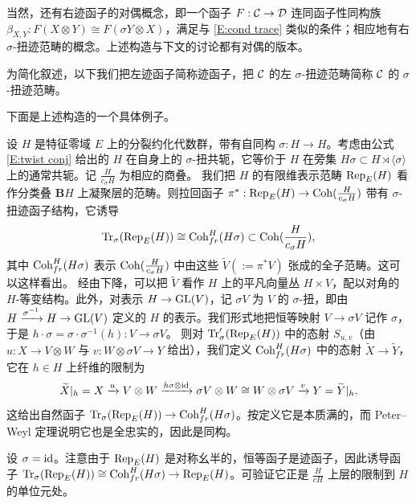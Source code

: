 \begin{rmk}
当然，还有右迹函子的对偶概念，即一个函子 $F:{\mathcal C}\to {\mathcal D}$ 连同函子性同构族 $\beta_{X,Y}: F(X\otimes Y)\cong F(\sigma Y\otimes X)$，满足与 \eqref{E:cond trace} 类似的条件；相应地有右 $\sigma$-扭迹范畴的概念。上述构造与下文的讨论都有对偶的版本。

为简化叙述，以下我们把左迹函子简称迹函子，把 ${\mathcal C}$ 的左 $\sigma$-扭迹范畴简称 ${\mathcal C}$ 的 $\sigma$-扭迹范畴。
\end{rmk}

下面是上述构造的一个具体例子。

\begin{ex}
\label{E: trace of rep}
设 $H$ 是特征零域 $E$ 上的分裂约化代数群，带有自同构 $\sigma: H\to H$。考虑由公式 \eqref{E:twist conj} 给出的 $H$ 在自身上的 $\sigma$-扭共轭，它等价于 $H$ 在旁集 $H\sigma\subset H\rtimes\langle\sigma\rangle$ 上的通常共轭。记 $\frac{H}{c_\sigma H}$ 为相应的商叠。
我们把 $H$ 的有限维表示范畴 $\operatorname{Rep}_E(H)$ 看作分类叠 $\mathbf BH$ 上凝聚层的范畴。则拉回函子 $\pi^*: \operatorname{Rep}_E(H)\to {\operatorname{Coh}}(\frac{H}{c_\sigma H})$ 带有 $\sigma$-扭迹函子结构，它诱导
\[{\operatorname{Tr}}_\sigma(\operatorname{Rep}_E(H))\cong \operatorname{Coh}_{fr}^H(H\sigma)\subset \operatorname{Coh}(\frac{H}{c_\sigma H}),\]
其中 ${\operatorname{Coh}}_{fr}^H(H\sigma)$ 表示 $\operatorname{Coh}(\frac{H}{c_\sigma H})$ 中由这些 $\widetilde V(:=\pi^*V)$ 张成的全子范畴。这可以这样看出。
经由下降，可以把 $\widetilde V$ 看作 $H$ 上的平凡向量丛 $H\times V$，配以对角的 $H$-等变结构。此外，对表示 $H\to {\operatorname{GL}}(V)$，记 $\sigma V$ 为 $V$ 的 $\sigma$-扭，即由 $H\xrightarrow{\sigma^{-1}}H\to{\operatorname{GL}}(V)$ 定义的 $H$ 的表示。我们形式地把恒等映射 $V\to \sigma V$ 记作 $\sigma$，于是 $h\cdot \sigma=\sigma\cdot \sigma^{-1}(h):V\to\sigma V$。
则对 ${\operatorname{Tr}}'_\sigma(\operatorname{Rep}_E(H))$ 中的态射 $S_{u,v}$（由 $u:X\to V\otimes W$ 与 $v:W\otimes \sigma V\to Y$ 给出），我们定义 ${\operatorname{Coh}}_{fr}^H(H\sigma)$ 中的态射 $\widetilde{X}\to\widetilde{Y}$，它在 $h\in H$ 上纤维的限制为
\[
\widetilde{X}|_h=X\xrightarrow{u} V\otimes W\xrightarrow{h\sigma\otimes{\operatorname{id}}}\sigma V\otimes W\cong W\otimes \sigma V\xrightarrow{v} Y=\widetilde{Y}|_h.
\]
这给出自然函子 ${\operatorname{Tr}}_\sigma(\operatorname{Rep}_E(H))\to {\operatorname{Coh}}_{fr}^H(H\sigma)$。按定义它是本质满的，而 Peter–Weyl 定理说明它也是全忠实的，因此是同构。

设 $\sigma={\operatorname{id}}$。注意由于 $\operatorname{Rep}_E(H)$ 是对称幺半的，恒等函子是迹函子，因此诱导函子 ${\operatorname{Tr}}_\sigma(\operatorname{Rep}_E(H))\cong {\operatorname{Coh}}_{fr}^H(H\sigma)\to \operatorname{Rep}_E(H)$。可验证它正是 $\frac{H}{cH}$ 上层的限制到 $H$ 的单位元处。
\end{ex}
